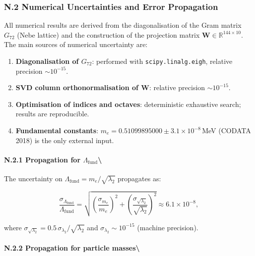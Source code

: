 \documentclass[11pt]{article}
\providecommand{\tightlist}{\setlength{\itemsep}{2pt}\setlength{\parskip}{6pt}}
\providecommand{\tightlist}{%
  \setlength{\itemsep}{2pt}\setlength{\parskip}{6pt}
}
\begin{document}
\hypertarget{n.2-numerical-uncertainties-and-error-propagation}{%
\subsubsection{N.2 Numerical Uncertainties and Error
Propagation}\label{n.2-numerical-uncertainties-and-error-propagation}}

All numerical results are derived from the diagonalisation of the Gram
matrix \(G_{72}\) (Nebe lattice) and the construction of the projection
matrix \(\mathbf{W} \in \mathbb{R}^{144\times 10}\). The main sources of
numerical uncertainty are:

\begin{enumerate}
\def\labelenumi{\arabic{enumi}.}
\tightlist
\item
  \textbf{Diagonalisation of \(G_{72}\)}: performed with
  \texttt{scipy.linalg.eigh}, relative precision \(\sim 10^{-15}\).
\item
  \textbf{SVD column orthonormalisation of \(\mathbf{W}\)}: relative
  precision \(\sim 10^{-15}\).
\item
  \textbf{Optimisation of indices and octaves}: deterministic exhaustive
  search; results are reproducible.
\item
  \textbf{Fundamental constants}:
  \(m_e = 0.51099895000 \pm 3.1\times10^{-8}\)\,MeV (CODATA 2018) is the
  only external input.
\end{enumerate}

\hypertarget{n.2.1-propagation-for-lambda_textfund}{%
\paragraph{\texorpdfstring{N.2.1 Propagation for
\(\Lambda_{\text{fund}}\)\textbackslash{}}{N.2.1 Propagation for \textbackslash Lambda\_\{\textbackslash text\{fund\}\}\textbackslash{}}}\label{n.2.1-propagation-for-lambda_textfund}}

The uncertainty on \(\Lambda_{\text{fund}} = m_e / \sqrt{\lambda_2}\)
propagates as:

\[
\frac{\sigma_{\Lambda_{\text{fund}}}}{\Lambda_{\text{fund}}}
= \sqrt{ \left(\frac{\sigma_{m_e}}{m_e}\right)^2 + \left(\frac{\sigma_{\sqrt{\lambda_2}}}{\sqrt{\lambda_2}}\right)^2 }
\approx 6.1 \times 10^{-8},
\]

where
\(\sigma_{\sqrt{\lambda_2}} = 0.5\,\sigma_{\lambda_2}/\sqrt{\lambda_2}\)
and \(\sigma_{\lambda_2} \sim 10^{-15}\) (machine precision).

\hypertarget{n.2.2-propagation-for-particle-masses}{%
\paragraph{N.2.2 Propagation for particle
masses\textbackslash{}}\label{n.2.2-propagation-for-particle-masses}}
\end{document}
